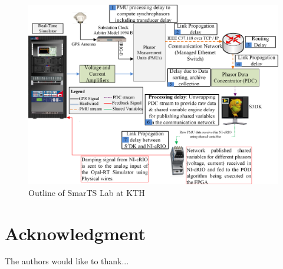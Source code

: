 \documentclass[journal]{IEEEtran}
\begin{document}
\begin{figure}[!t]
\centering
\includegraphics[width=1\linewidth]{./SmarTSlabOutline}
\caption{Outline of SmarTS Lab at KTH}
\label{fig:SmarTSlabOutline}
\end{figure}



\section*{Acknowledgment}


The authors would like to thank...


\ifCLASSOPTIONcaptionsoff
  \newpage
\fi




\end{document}
